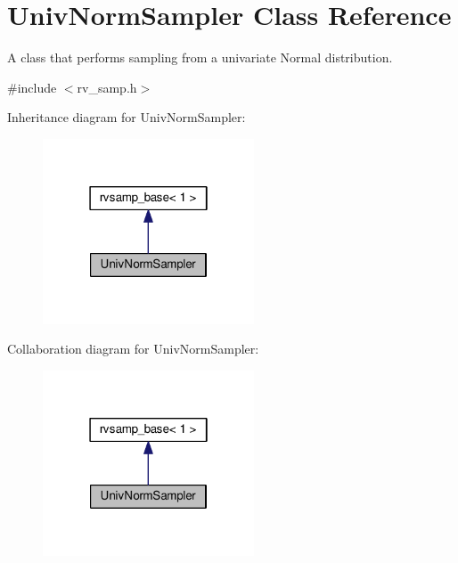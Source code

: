 \hypertarget{classUnivNormSampler}{}\section{Univ\+Norm\+Sampler Class Reference}
\label{classUnivNormSampler}


A class that performs sampling from a univariate Normal distribution.  




{\ttfamily \#include $<$rv\+\_\+samp.\+h$>$}



Inheritance diagram for Univ\+Norm\+Sampler\+:\nopagebreak
\begin{figure}[H]
\begin{center}
\leavevmode
\includegraphics[width=178pt]{classUnivNormSampler__inherit__graph}
\end{center}
\end{figure}


Collaboration diagram for Univ\+Norm\+Sampler\+:\nopagebreak
\begin{figure}[H]
\begin{center}
\leavevmode
\includegraphics[width=178pt]{classUnivNormSampler__coll__graph}
\end{center}
\end{figure}
